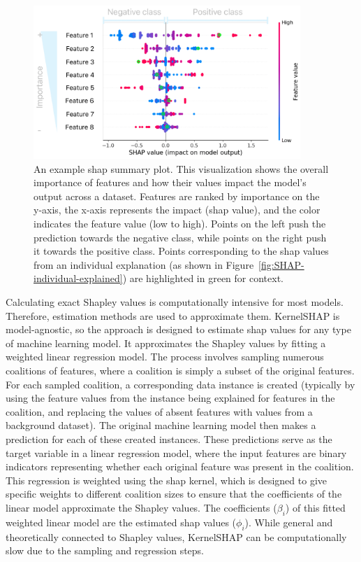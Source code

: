 \documentclass[12pt,a4paper]{report}
\begin{document}
\begin{figure}[h!]
  \centering
  \includegraphics[width=0.9\textwidth]{images/SHAP-explained.png}
  \caption[Example \gls{shap} Summary Plot]{An example \gls{shap} summary plot. This visualization shows the overall importance of features and how their values impact the model's output across a dataset. Features are ranked by importance on the y-axis, the x-axis represents the impact (\gls{shap} value), and the color indicates the feature value (low to high). Points on the left push the prediction towards the negative class, while points on the right push it towards the positive class. Points corresponding to the \gls{shap} values from an individual explanation (as shown in Figure~\ref{fig:SHAP-individual-explained}) are highlighted in green for context.}
  \label{fig:SHAP-plot-explained}
\end{figure}
\noindent
Calculating exact Shapley values is computationally intensive for most models. Therefore, estimation methods are used to approximate them. KernelSHAP \cite{ApprouchForModelPredictions} is model-agnostic, so the approach is designed to estimate \gls{shap} values for any type of machine learning model. It approximates the Shapley values by fitting a weighted linear regression model. The process involves sampling numerous coalitions of features, where a coalition is simply a subset of the original features. For each sampled coalition, a corresponding data instance is created (typically by using the feature values from the instance being explained for features in the coalition, and replacing the values of absent features with values from a background dataset). The original machine learning model then makes a prediction for each of these created instances. These predictions serve as the target variable in a linear regression model, where the input features are binary indicators representing whether each original feature was present in the coalition. This regression is weighted using the \gls{shap} kernel, which is designed to give specific weights to different coalition sizes to ensure that the coefficients of the linear model approximate the Shapley values. The coefficients ($\beta_i$) of this fitted weighted linear model are the estimated \gls{shap} values ($\phi_i$). While general and theoretically connected to Shapley values, KernelSHAP can be computationally slow due to the sampling and regression steps.\\
\end{document}
